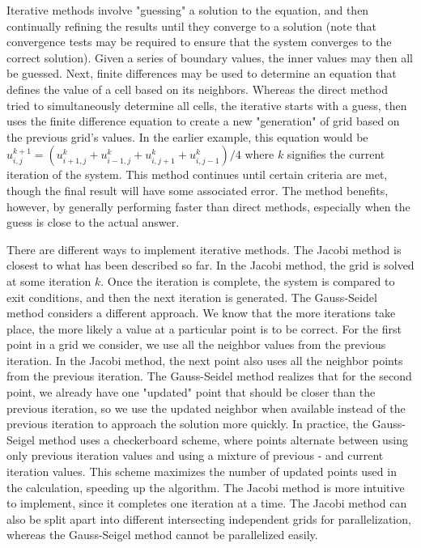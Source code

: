 \documentclass[twocolumn]{article}
\begin{document}
Iterative methods involve "guessing" a solution to the equation, and then continually refining the results until they converge to a solution (note that convergence tests may be required to ensure that the system converges to the correct solution). Given a series of boundary values, the inner values may then all be guessed. Next, finite differences may be used to determine an equation that defines the value of a cell based on its neighbors. Whereas the direct method tried to simultaneously determine all cells, the iterative starts with a guess, then uses the  finite difference equation to create a new "generation" of grid based on the previous grid's values. In the earlier example, this equation would be $u_{i,j}^{k+1} = (u_{i+1,j}^{k} + u_{i-1,j}^{k} + u_{i,j+1}^{k} + u_{i,j-1}^{k})/4 $ where $k$ signifies the current iteration of the system. This method continues until certain criteria are met, though the final result will have some associated error. The method benefits, however, by generally performing faster than direct methods, especially when the guess is close to the actual answer.

There are different ways to implement iterative methods. The Jacobi method is closest to what has been described so far. In the Jacobi method, the grid is solved at some iteration $k$. Once the iteration is complete, the system is compared to exit conditions, and then the next iteration is generated. The Gauss-Seidel method considers a different approach. We know that the more iterations take place, the more likely a value at a particular point is to be correct. For the first point in a grid we consider, we use all the neighbor values from the previous iteration. In the Jacobi method, the next point also uses all the neighbor points from the previous iteration. The Gauss-Seidel method realizes that for the second point, we already have one "updated" point that should be closer than the previous iteration, so we use the updated neighbor when available instead of the previous iteration to approach the solution more quickly. In practice, the Gauss-Seigel method uses a checkerboard scheme, where points alternate between using only previous iteration values and using a mixture of previous -  and current iteration values. This scheme maximizes the number of updated points used in the calculation, speeding up the algorithm. The Jacobi method is more intuitive to implement, since it completes one iteration at a time. The Jacobi method can also be split apart into different intersecting independent grids for parallelization, whereas the Gauss-Seigel method cannot be parallelized easily.
\end{document}
